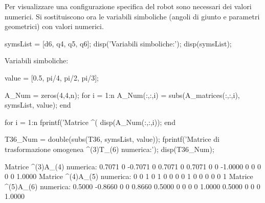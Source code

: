 \documentclass[11pt, a4paper]{article}
\begin{document}
\begin{par}
\begin{flushleft}
Per visualizzare una configurazione specifica del robot sono necessari dei valori numerici. Si sostituiscono ora le variabili simboliche (angoli di giunto e parametri geometrici) con valori numerici.
\end{flushleft}
\end{par}

\begin{matlabcode}
symsList = [d6, q4, q5, q6];
disp('Variabili simboliche:');
disp(symsList);
\end{matlabcode}
\begin{matlaboutput}
Variabili simboliche:
\end{matlaboutput}
\newpage
\begin{matlabcode}
value = [0.5, pi/4, pi/2, pi/3];

A_Num = zeros(4,4,n);
for i = 1:n
    A_Num(:,:,i) = subs(A_matrices(:,:,i), symsList, value);
end

for i = 1:n
    fprintf('Matrice ^(%
    disp(A_Num(:,:,i));
end

T36_Num = double(subs(T36, symsList, value));
fprintf('Matrice di trasformazione omogenea ^(3)T_(6) numerica:\n');
disp(T36_Num);
\end{matlabcode}
\begin{matlaboutput}
Matrice ^(3)A_(4) numerica:
    0.7071         0   -0.7071         0
    0.7071         0    0.7071         0
         0   -1.0000         0         0
         0         0         0    1.0000
Matrice ^(4)A_(5) numerica:
     0     0     1     0
     1     0     0     0
     0     1     0     0
     0     0     0     1
Matrice ^(5)A_(6) numerica:
    0.5000   -0.8660         0         0
    0.8660    0.5000         0         0
         0         0    1.0000    0.5000
         0         0         0    1.0000
\end{matlaboutput}
\end{document}

